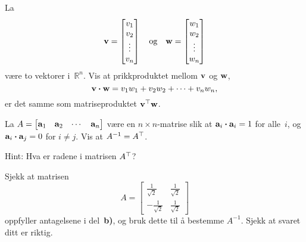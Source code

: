 \begin{oppgave}


\begin{punkt}
La
\[
\mathbf{v}=\begin{bmatrix}
v_1\\
v_2\\
\vdots\\
v_n
\end{bmatrix}
\quad\text{og}\quad
\mathbf{w}=\begin{bmatrix}
w_1\\
w_2\\
\vdots\\
w_n
\end{bmatrix}
\]
være to vektorer i~$\mathbb{R}^n$. Vis at prikkproduktet mellom $\mathbf{v}$ og $\mathbf{w}$, $$\mathbf{v}\boldsymbol{\cdot} \mathbf{w}=v_1w_1+v_2w_2+\cdots+v_nw_n,$$ er det samme som matriseproduktet $\mathbf{v}^\top\mathbf{w}$.
\end{punkt}

\begin{punkt}
La $A=\begin{bmatrix}
\mathbf{a}_1 & \mathbf{a}_2 & \cdots & \mathbf{a}_n
\end{bmatrix}
$
være en $n\times n$-matrise slik at
$\mathbf{a}_i \boldsymbol{\cdot} \mathbf{a}_i=1$ for alle~$i$, og
$\mathbf{a}_i\boldsymbol{\cdot} \mathbf{a}_j=0$ for $i\neq j$. Vis at
$A^{-1}=A^\top$.

Hint: Hva er radene i matrisen $A^\top$?
\end{punkt}

\begin{punkt}
Sjekk at matrisen
\[
A=\begin{bmatrix}
\frac{1}{\sqrt{2}} & \frac{1}{\sqrt{2}}\\
-\frac{1}{\sqrt{2}} & \frac{1}{\sqrt{2}}
\end{bmatrix}
\]
oppfyller antagelsene i del~\textbf{b)}, og bruk dette til å bestemme
$A^{-1}$. Sjekk at svaret ditt er riktig.
\end{punkt}

\end{oppgave}


